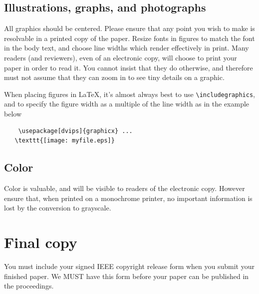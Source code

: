 \documentclass[10pt,twocolumn,letterpaper]{article}
\begin{document}
\subsection{Illustrations, graphs, and photographs}

All graphics should be centered.  Please ensure that any point you
wish to make is resolvable in a printed copy of the paper.  Resize
fonts in figures to match the font in the body text, and choose line
widths which render effectively in print.  Many readers (and
reviewers), even of an electronic copy, will choose to print your
paper in order to read it.  You cannot insist that they do otherwise,
and therefore must not assume that they can zoom in to see tiny
details on a graphic.

When placing figures in \LaTeX, it's almost always best to use
\verb+\includegraphics+, and to specify the figure width as a multiple
of the line width as in the example below {\small\begin{verbatim}
    \usepackage[dvips]{graphicx} ...
   \texttt{[image: myfile.eps]}
\end{verbatim}
}


\subsection{Color}

Color is valuable, and will be visible to readers of the electronic
copy.  However ensure that, when printed on a monochrome printer, no
important information is lost by the conversion to grayscale.

\section{Final copy}

You must include your signed IEEE copyright release form when you
submit your finished paper. We MUST have this form before your paper
can be published in the proceedings.


{\small   }
\end{document}
